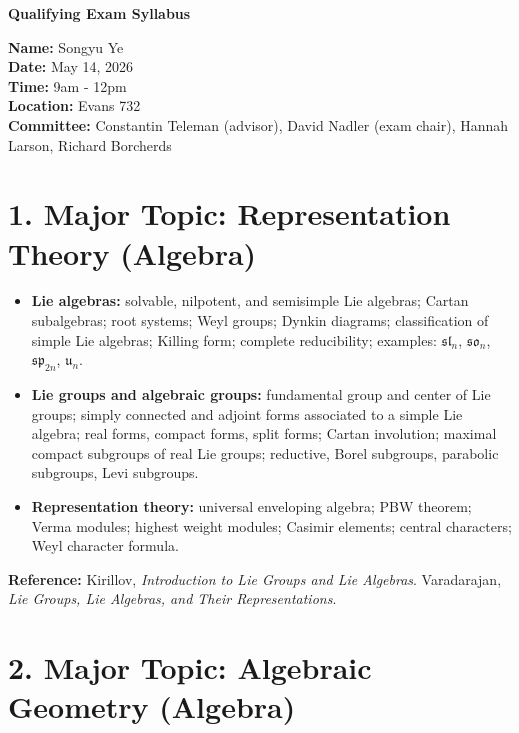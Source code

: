 \documentclass[11pt]{article}
\begin{document}
\begin{center}
    {\LARGE \textbf{Qualifying Exam Syllabus}}\\[1em]
\end{center}

\textbf{Name:} Songyu Ye \\
\textbf{Date:} May 14, 2026 \\
\textbf{Time:} 9am - 12pm \\
\textbf{Location:} Evans 732 \\
\textbf{Committee:} Constantin Teleman (advisor), David Nadler (exam chair), Hannah Larson, Richard Borcherds

\vspace{1em}

\section*{1. Major Topic: Representation Theory (Algebra)}

\begin{itemize}[leftmargin=2em]
    \item \textbf{Lie algebras:} solvable, nilpotent, and semisimple Lie algebras; Cartan subalgebras; root systems; Weyl groups; Dynkin diagrams; classification of simple Lie algebras; Killing form; complete reducibility; examples: $\mathfrak{sl}_n$, $\mathfrak{so}_n$, $\mathfrak{sp}_{2n}$, $\mathfrak{u}_n$.

    \item \textbf{Lie groups and algebraic groups:} fundamental group and center of Lie groups; simply connected and adjoint forms associated to a simple Lie algebra; real forms, compact forms, split forms; Cartan involution; maximal compact subgroups of real Lie groups; reductive, Borel subgroups, parabolic subgroups, Levi subgroups.

    \item \textbf{Representation theory:} universal enveloping algebra; PBW theorem; Verma modules; highest weight modules; Casimir elements; central characters; Weyl character formula.
\end{itemize}

\textbf{Reference:} Kirillov, \emph{Introduction to Lie Groups and Lie Algebras}. Varadarajan, \emph{Lie Groups, Lie Algebras, and
Their Representations}.

\section*{2. Major Topic: Algebraic Geometry (Algebra)}
\end{document}
